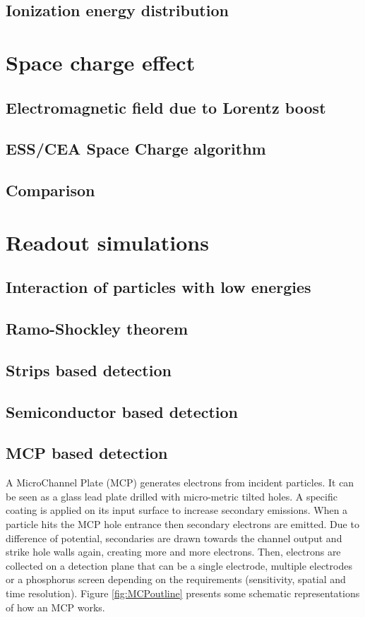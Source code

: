 \begin{refsection}
  

  \subsection{Ionization energy distribution}
  \section{Space charge effect}
  \subsection{Electromagnetic field due to Lorentz boost}
  \subsection{ESS/CEA Space Charge algorithm}
  \subsection{Comparison}
  \section{Readout simulations}
  \subsection{Interaction of particles with low energies}
  
  \subsection{Ramo-Shockley theorem}
  \cite[]{Ramo_1939}\cite[]{Shockley_1938}\cite[]{Cavalleri1971}\cite[]{Jen1941}
  \subsection{Strips based detection}
  \subsection{Semiconductor based detection}
  \subsection{MCP based detection}

  A MicroChannel Plate (MCP) generates electrons from incident particles. 
  It can be seen as a glass lead plate drilled with micro-metric tilted holes. 
  A specific coating is applied on its input surface to increase secondary emissions. When a particle hits the MCP hole entrance then secondary electrons are emitted. Due to difference of potential, secondaries are drawn towards the channel output and strike hole walls again, creating more and more electrons. Then, electrons are collected on a detection plane that can be a single electrode, multiple electrodes or a phosphorus screen depending on the requirements (sensitivity, spatial and time resolution). Figure \ref{fig:MCPoutline} presents some schematic representations of how an MCP works.


\end{refsection}

